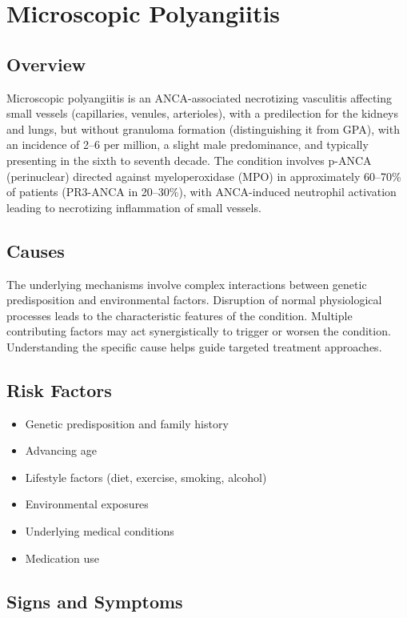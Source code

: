 \chapter{Microscopic Polyangiitis}
\label{sec:Microscopic Polyangiitis (MPA)}

\section{Overview}
Microscopic polyangiitis is an ANCA-associated necrotizing vasculitis affecting small vessels (capillaries, venules, arterioles), with a predilection for the kidneys and lungs, but without granuloma formation (distinguishing it from GPA), with an incidence of 2--6 per million, a slight male predominance, and typically presenting in the sixth to seventh decade. The condition involves p-ANCA (perinuclear) directed against myeloperoxidase (MPO) in approximately 60--70\% of patients (PR3-ANCA in 20--30\%), with ANCA-induced neutrophil activation leading to necrotizing inflammation of small vessels.
\section{Causes}
The underlying mechanisms involve complex interactions between genetic predisposition and environmental factors. Disruption of normal physiological processes leads to the characteristic features of the condition. Multiple contributing factors may act synergistically to trigger or worsen the condition. Understanding the specific cause helps guide targeted treatment approaches.
\section{Risk Factors}


\begin{itemize}[noitemsep]
  \item Genetic predisposition and family history
  \item Advancing age
  \item Lifestyle factors (diet, exercise, smoking, alcohol)
  \item Environmental exposures
  \item Underlying medical conditions
  \item Medication use
\end{itemize}
\section{Signs and Symptoms}

